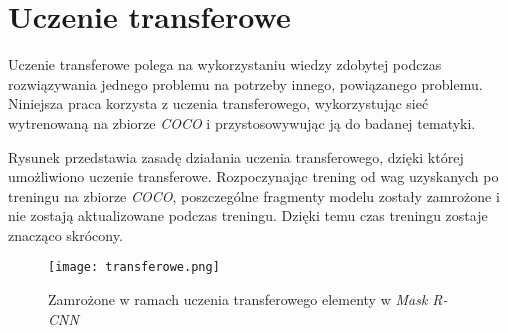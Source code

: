 \newpage
\section{Uczenie transferowe}
\label{sec:uczenie-transferowe}

Uczenie transferowe polega na wykorzystaniu wiedzy zdobytej podczas rozwiązywania jednego problemu na potrzeby innego, powiązanego problemu.
Niniejsza praca korzysta z uczenia transferowego, wykorzystując sieć wytrenowaną na zbiorze \textit{COCO} \cite{coco} i przystosowywując ją do badanej tematyki.

Rysunek  przedstawia zasadę działania uczenia transferowego, dzięki której umożliwiono uczenie transferowe. Rozpoczynając trening od wag uzyskanych po treningu na zbiorze \textit{COCO}, poszczególne fragmenty modelu zostały zamrożone i nie zostają aktualizowane podczas treningu. Dzięki temu czas treningu zostaje znacząco skrócony.

\begin{figure}[h]
  \centering
  \texttt{[image: transferowe.png]}
  \caption{Zamrożone w ramach uczenia transferowego elementy w \textit{Mask R-CNN}}
  \label{fig:transferowe}
\end{figure}
